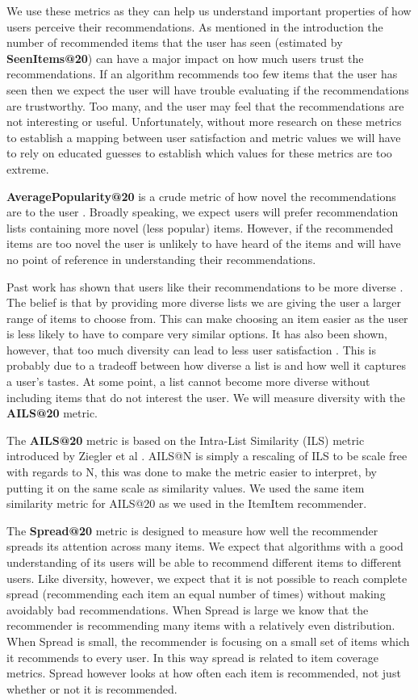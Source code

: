 \documentclass[letterpaper]{sig-alternate}
\begin{document}
  We use these metrics as they can help us understand important properties of how users perceive their recommendations.
  As mentioned in the introduction the number of recommended items that the user has seen (estimated by {\bf SeenItems@20}) can have a major impact on how much users trust the recommendations.
  If an algorithm recommends too few items that the user has seen then we expect the user will have trouble evaluating if the recommendations are trustworthy.
  Too many, and the user may feel that the recommendations are not interesting or useful.
  Unfortunately, without more research on these metrics to establish a mapping between user satisfaction and metric values we will have to rely on educated guesses to establish which values for these metrics are too extreme.

  {\bf AveragePopularity@20} is a crude metric of how novel the recommendations are to the user \cite{zieglerDiversity}.
  Broadly speaking, we expect users will prefer recommendation lists containing more novel (less popular) items.
  However, if the recommended items are too novel the user is unlikely to have heard of the items and will have no point of reference in understanding their recommendations.

  Past work has shown that users like their recommendations to be more diverse \cite{zieglerDiversity, martijnDiversity}.
  The belief is that by providing more diverse lists we are giving the user a larger range of items to choose from.
  This can make choosing an item easier as the user is less likely to have to compare very similar options.
  It has also been shown, however, that too much diversity can lead to less user satisfaction \cite{zieglerDiversity}.
  This is probably due to a tradeoff between how diverse a list is and how well it captures a user's tastes.
  At some point, a list cannot become more diverse without including items that do not interest the user.
  We will measure diversity with the {\bf AILS@20} metric.

  The {\bf AILS@20} metric is based on the Intra-List Similarity (ILS) metric introduced by Ziegler et al \cite{zieglerDiversity}.
  AILS@N is simply a rescaling of ILS to be scale free with regards to N, this was done to make the metric easier to interpret, by putting it on the same scale as similarity values.
  We used the same item similarity metric for AILS@20 as we used in the ItemItem recommender.

  The {\bf Spread@20} metric is designed to measure how well the recommender spreads its attention across many items.
  We expect that algorithms with a good understanding of its users will be able to recommend different items to different users.
  Like diversity, however, we expect that it is not possible to reach complete spread (recommending each item an equal number of times) without making avoidably bad recommendations.
  When Spread is large we know that the recommender is recommending many items with a relatively even distribution.
  When Spread is small, the recommender is focusing on a small set of items which it recommends to every user.
  In this way spread is related to item coverage metrics.
  Spread however looks at how often each item is recommended, not just whether or not it is recommended.
\end{document}
